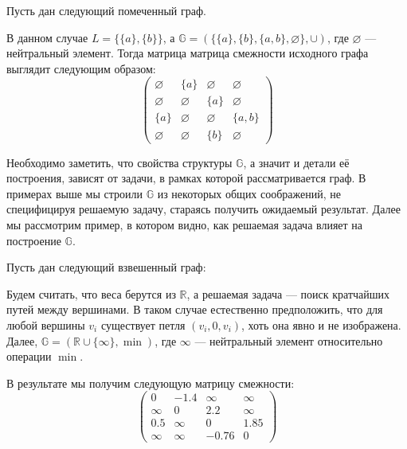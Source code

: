 \begin{example}
  Пусть дан следующий помеченный граф.
  \begin{center}
    
  \end{center}

  В данном случае $L = \{\{a\},\{b\}\}$, а $\mathbb{G} = ( \{\{a\},\{b\},\{a,b\},\varnothing\} ,\cup)$, где $\varnothing$ --- нейтральный элемент.
  Тогда матрица матрица смежности исходного графа выглядит следующим образом:
  $$
  \begin{pmatrix}
    \varnothing   & \{a\}       & \varnothing & \varnothing \\
    \varnothing   & \varnothing & \{a\}       & \varnothing \\
    \{a\}         & \varnothing & \varnothing & \{a,b\} \\
    \varnothing   & \varnothing & \{b\}       & \varnothing
  \end{pmatrix}
  $$
\end{example}

Необходимо заметить, что свойства структуры $\mathbb{G}$, а значит и детали её построения, зависят от задачи, в рамках которой рассматривается граф. В примерах выше мы строили $\mathbb{G}$ из некоторых общих соображений, не специфицируя решаемую задачу, стараясь получить ожидаемый результат. Далее мы рассмотрим пример, в котором видно, как решаемая задача влияет на построение $\mathbb{G}$.

\begin{example}\label{example:apspGraph}
  Пусть дан следующий взвешенный граф:
  \begin{center}
    
  \end{center}

  Будем считать, что веса берутся из $\mathbb{R}$, а решаемая задача --- поиск кратчайших путей между вершинами. В таком случае естественно предположить, что для любой вершины $v_i$ существует петля $(v_i,0,v_i)$, хоть она явно и не изображена. Далее, $\mathbb{G} = ( \mathbb{R}\cup \{\infty\} , \min)$, где $\infty$ --- нейтральный элемент относительно операции $\min$.

  В результате мы получим следующую матрицу смежности:
  $$
  \begin{pmatrix}
    0 & -1.4 & \infty & \infty \\
    \infty & 0 & 2.2 & \infty \\
    0.5 & \infty & 0 & 1.85 \\
    \infty & \infty & -0.76 & 0
  \end{pmatrix}
  $$
\end{example}

